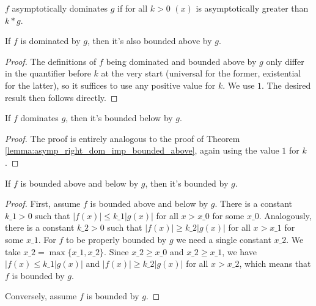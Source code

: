 \begin{definition}
    \label{def:asymp_left_dom}
    \leanok
    $f$ asymptotically dominates $g$ if for all $k > 0$ $(x)$ is asymptotically
    greater than $k*g$.

\end{definition}

\begin{lemma}
    \label{lemma:asymp_right_dom_imp_bounded_above}
    \leanok
    If $f$ is dominated by $g$, then it's also bounded above by $g$.
\end{lemma}

\begin{proof}
    \leanok 
    The definitions of $f$ being dominated and bounded above by $g$ only differ
    in the quantifier before $k$ at the very start (universal for the former, existential
    for the latter), so it suffices to use any positive value for $k$. We use $1$. 
    The desired result then follows directly.
\end{proof}

\begin{lemma}
    \label{lemma:asymp_left_dom_imp_bounded_below}
    \leanok
    If $f$ dominates $g$, then it's bounded below by $g$.
\end{lemma}

\begin{proof}
    \leanok
    The proof is entirely analogous to the proof of Theorem 
    \ref{lemma:asymp_right_dom_imp_bounded_above}, again using the value 
    $1$ for $k$.
\end{proof}
\begin{theorem}
    \label{thm:asymp_bounded_above_below_iff}
    \leanok
    If $f$ is bounded above and below by $g$, then it's bounded by $g$.
\end{theorem}

\begin{proof}
    \leanok
    First, assume $f$ is bounded above and below by $g$. There is a constant
    $k\_1 > 0$ such that $|f(x)| \le k\_1 |g(x)|$ for all $x > x\_0$ for some $x\_0$.
    Analogously, there is a constant $k\_2 > 0$ such that $|f(x)| \ge k\_2 |g(x)|$ 
    for all $x > x\_1$ for some $x\_1$. For $f$ to be properly bounded by $g$ 
    we need a single constant $x\_2$. We take $x\_2 = \max{\{x\_1, x\_2\}}$. Since 
    $x\_2 \ge x\_0$ and $x\_2 \ge x\_1$, we have $|f(x) \le k\_1 |g(x)|$ and 
    $|f(x)| \ge k\_2 |g(x)|$ for all $x > x\_2$, which means that $f$ is bounded
    by $g$.

    Conversely, assume $f$ is bounded by $g$.
\end{proof}

